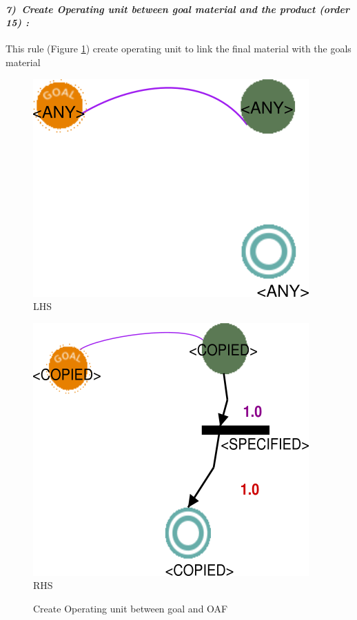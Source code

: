 \paragraph{\emph{7)~Create Operating unit between  goal material  and the product (order 15) :} }
 
 
This rule (Figure \ref{fig:Create Operating unit between  goal and OAF}) 
create operating unit to link the final material with the goals material  
\vspace{1cm}
\begin{figure}[th]
\centering
\begin{minipage}{.5\textwidth}
  \begin{center}
  \includegraphics[width=.7\linewidth]{chapiter3/img/L7}
  LHS
  \end{center}
  
\end{minipage}%
\begin{minipage}{.5\textwidth}
  \begin{center}
  \includegraphics[width=.7\linewidth]{chapiter3/img/R7}
  RHS 
  \end{center}
\end{minipage}
\caption{\label{fig:Create Operating unit between  goal and OAF}Create Operating unit between  goal and OAF}
 
\end{figure}
\vspace{1cm}




